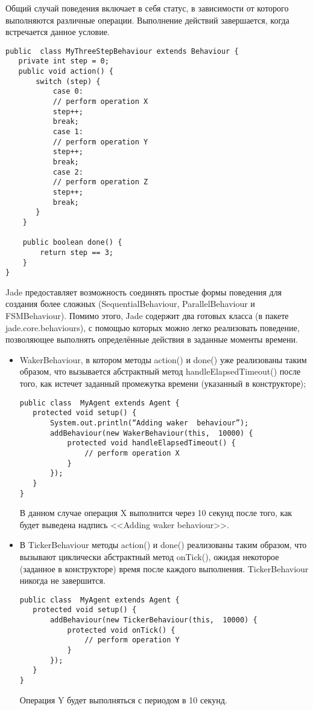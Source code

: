 Общий случай поведения включает в себя статус, в зависимости от которого выполняются различные операции. Выполнение действий завершается, когда встречается данное условие.
\begin{verbatim}
public  class MyThreeStepBehaviour extends Behaviour { 
   private int step = 0; 
   public void action() { 
       switch (step) { 
           case 0: 
           // perform operation X 
           step++; 
           break; 
           case 1: 
           // perform operation Y 
           step++; 
           break; 
           case 2: 
           // perform operation Z 
           step++; 
           break; 
       } 
    } 

    public boolean done() { 
        return step == 3; 
    } 
}
\end{verbatim}
Jade предоставляет возможность соединять простые формы поведения для создания более сложных (SequentialBehaviour, ParallelBehaviour и FSMBehaviour). Помимо этого, Jade содержит два готовых класса (в пакете jade.core.behaviours), с помощью которых можно легко реализовать поведение, позволяющее выполнять определённые действия в заданные моменты времени.
\begin{itemize}
\item WakerBehaviour, в котором методы action() и done() уже реализованы таким образом, что вызывается абстрактный метод handleElapsedTimeout() после того, как истечет заданный промежутка времени (указанный в конструкторе);
\begin{verbatim}
public class  MyAgent extends Agent { 
   protected void setup() { 
       System.out.println(“Adding waker  behaviour”); 
       addBehaviour(new WakerBehaviour(this,  10000) { 
           protected void handleElapsedTimeout() { 
               // perform operation X 
           } 
       }); 
   } 
}
\end{verbatim}
В данном случае операция X выполнится через 10 секунд после того, как будет выведена надпись <<Adding waker behaviour>>.
\item В TickerBehaviour методы action() и done() реализованы таким образом, что вызывают циклически абстрактный метод onTick(), ожидая некоторое (заданное в конструкторе) время после каждого выполнения. TickerBehaviour никогда не завершится. 
\begin{verbatim}
public class  MyAgent extends Agent { 
   protected void setup() { 
       addBehaviour(new TickerBehaviour(this,  10000) { 
           protected void onTick() { 
               // perform operation Y 
           } 
       }); 
   } 
}
\end{verbatim}
Операция Y будет выполняться с периодом в 10 секунд.
\end{itemize}

